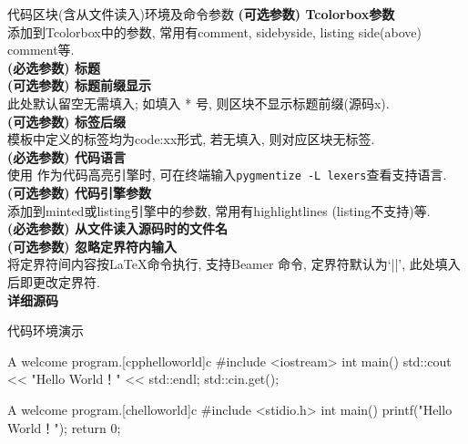 \documentclass[hyperref, UTF8, CJK, aspectratio=169]{beamer}
\begin{document}
\begin{frame}{代码区块(含从文件读入)环境及命令参数}
	\alert{}\hfill \textbf{(可选参数) Tcolorbox参数}\\
	添加到Tcolorbox中的参数, 常用有comment, sidebyside, listing side(above) comment等.\\
	
	\alert{}\hfill \textbf{(必选参数) 标题}\\
	
	\alert{}\hfill \textbf{(可选参数) 标题前缀显示}\\
	此处默认留空无需填入; 如填入 * 号, 则区块不显示标题前缀(源码x).\\	
		
	\alert{}\hfill \textbf{(可选参数) 标签后缀}\\
	模板中定义的标签均为code:xx形式, 若无填入, 则对应区块无标签.\\
	
	\alert{}\hfill \textbf{(必选参数) 代码语言}\\
	使用  作为代码高亮引擎时, 可在终端输入\texttt{pygmentize -L lexers}查看支持语言.\\
	
	\alert{}\hfill \textbf{(可选参数) 代码引擎参数}\\
	添加到minted或listing引擎中的参数, 常用有highlightlines (listing不支持)等.\\
	
	\alert{}\hfill \textbf{(必选参数) 从文件读入源码时的文件名}\\
	
	\alert{}\hfill \textbf{(可选参数) 忽略定界符内输入}\\
	将定界符间内容按\LaTeX{}命令执行, 支持Beamer 命令, 定界符默认为`||', 此处填入后即更改定界符.\\
	
	\alert{}\hfill \textbf{详细源码}
\end{frame}

\begin{frame}[fragile]{代码环境演示}
	\onslide<2>
	\begin{scucode}{A welcome program.}[cpphelloworld]{c}
		#include <iostream>
		int main()
		{
			std::cout << "Hello World！" << std::endl;
			std::cin.get();
		}
	\end{scucode}
	\begin{scucode}{A welcome program.}[chelloworld]{c}
		#include <stidio.h>
		int main()
		{
			printf("Hello World！");
			return 0;
		}
	\end{scucode}
\end{frame}
\end{document}
